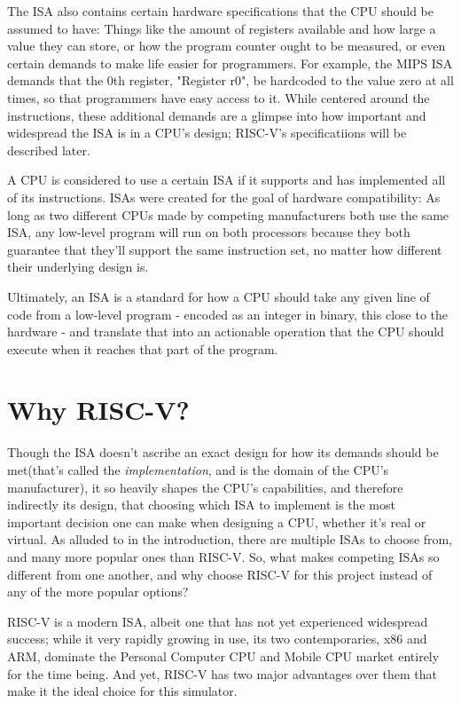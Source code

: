 \documentclass[12pt,twoside]{reedthesis}
\begin{document}
The ISA also contains certain hardware specifications that the CPU should be assumed to have: Things like the amount of registers available and how large a value they can store, or how the program counter ought to be measured, or even certain demands to make life easier for programmers. For example, the MIPS ISA demands that the 0th register, "Register r0", be hardcoded to the value zero at all times, so that programmers have easy access to it. While centered around the instructions, these additional demands are a glimpse into how important and widespread the ISA is in a CPU's design; RISC-V's specificatiions will be described later.

A CPU is considered to use a certain ISA if it supports and has implemented all of its instructions. ISAs were created for the goal of hardware compatibility: As long as two different CPUs made by competing manufacturers both use the same ISA, any low-level program will run on both processors because they both guarantee that they'll support the same instruction set, no matter how different their underlying design is.

Ultimately, an ISA is a standard for how a CPU should take any given line of code from a low-level program - encoded as an integer in binary, this close to the hardware - and translate that into an actionable operation that the CPU should execute when it reaches that part of the program.

\section{Why RISC-V?}
Though the ISA doesn't ascribe an exact design for how its demands should be met(that's called the \textit{implementation}, and is the domain of the CPU's manufacturer), it so heavily shapes the CPU's capabilities, and therefore indirectly its design, that choosing which ISA to implement is the most important decision one can make when designing a CPU, whether it's real or virtual. As alluded to in the introduction, there are multiple ISAs to choose from, and many more popular ones than RISC-V. So, what makes competing ISAs so different from one another, and why choose RISC-V for this project instead of any of the more popular options?


RISC-V is a modern ISA, albeit one that has not yet experienced widespread success; while it very rapidly growing in use, its two contemporaries, x86 and ARM, dominate the Personal Computer CPU and Mobile CPU market entirely for the time being. And yet, RISC-V has two major advantages over them that make it the ideal choice for this simulator.
\end{document}
